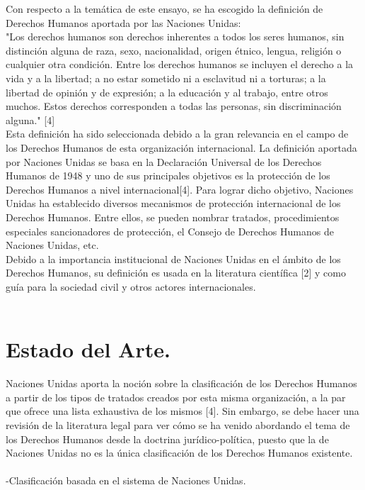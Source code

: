 \documentclass[10pt,a4paper]{article}
\begin{document}
Con respecto a la temática de este ensayo, se ha escogido la definición de Derechos Humanos aportada por las Naciones Unidas: \\
"Los derechos humanos son derechos inherentes a todos los seres humanos, sin distinción alguna de raza, sexo, nacionalidad, origen étnico, lengua, religión o cualquier otra condición. Entre los derechos humanos se incluyen el derecho a la vida y a la libertad; a no estar sometido ni a esclavitud ni a torturas; a la libertad de opinión y de expresión; a la educación y al trabajo, entre otros muchos. Estos derechos corresponden a todas las personas, sin discriminación alguna." [4]\\
Esta definición ha sido seleccionada debido a la gran relevancia en el campo de los Derechos Humanos de esta organización internacional. La definición aportada por Naciones Unidas se basa en la Declaración Universal de los Derechos Humanos de 1948 y uno de sus principales objetivos es la protección de los Derechos Humanos a nivel internacional[4]. Para lograr dicho objetivo, Naciones Unidas ha establecido diversos mecanismos de protección internacional de los Derechos Humanos. Entre ellos, se pueden nombrar tratados, procedimientos especiales sancionadores de protección, el Consejo de Derechos Humanos de Naciones Unidas, etc.\\
Debido a la importancia institucional de Naciones Unidas en el ámbito de los Derechos Humanos, su definición es usada en la literatura científica [2] y como guía para la sociedad civil y otros actores internacionales.\\
\\

 
\newpage
\section{Estado del Arte.}
Naciones Unidas aporta la noción sobre la clasificación de los Derechos Humanos a partir de los tipos de tratados creados por esta misma organización, a la par que ofrece una lista exhaustiva de los mismos [4]. Sin embargo,  se debe hacer una revisión de la literatura legal para ver cómo se ha venido abordando el tema de los Derechos Humanos desde la doctrina jurídico-política, puesto que la de Naciones Unidas no es la única clasificación de los Derechos Humanos existente.\\
\\
-Clasificación basada en el sistema de Naciones Unidas.\\
\end{document}
